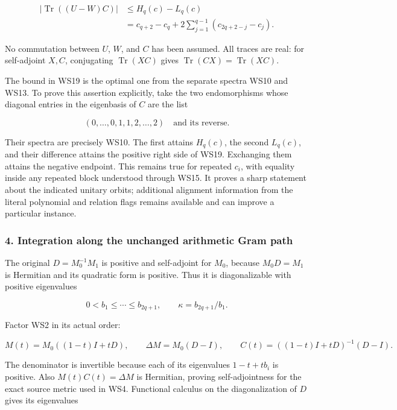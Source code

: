 \[
\boxed{
\begin{aligned}
\left|\operatorname{Tr}((U-W)C)\right|
&\le H_q(c)-L_q(c)\\
&=c_{q+2}-c_q
 +2\sum_{j=1}^{q-1}(c_{2q+2-j}-c_j).
\end{aligned}}
\tag{WS19}
\]

No commutation between \(U\), \(W\), and \(C\) has been assumed. All traces are real: for self-adjoint \(X,C\), conjugating \(\operatorname{Tr}(XC)\) gives \(\operatorname{Tr}(CX)=\operatorname{Tr}(XC)\).

The bound in WS19 is the optimal one from the separate spectra WS10 and WS13. To prove this assertion explicitly, take the two endomorphisms whose diagonal entries in the eigenbasis of \(C\) are the list

\[
(0,\ldots,0,1,1,2,\ldots,2)
\quad\text{and its reverse}.
\tag{WS20}
\]

Their spectra are precisely WS10. The first attains \(H_q(c)\), the second \(L_q(c)\), and their difference attains the positive right side of WS19. Exchanging them attains the negative endpoint. This remains true for repeated \(c_i\), with equality inside any repeated block understood through WS15. It proves a sharp statement about the indicated unitary orbits; additional alignment information from the literal polynomial and relation flags remains available and can improve a particular instance.

\subsubsection{4. Integration along the unchanged arithmetic Gram path}\label{endpoint-window_review--integration-along-the-unchanged-arithmetic-gram-path}

The original \(D=M_0^{-1}M_1\) is positive and self-adjoint for \(M_0\), because \(M_0D=M_1\) is Hermitian and its quadratic form is positive. Thus it is diagonalizable with positive eigenvalues

\[
0<b_1\le\cdots\le b_{2q+1},
\qquad\kappa=b_{2q+1}/b_1.
\tag{WS21}
\]

Factor WS2 in its actual order:

\[
M(t)=M_0((1-t)I+tD),
\qquad\Delta M=M_0(D-I),
\qquad
C(t)=((1-t)I+tD)^{-1}(D-I).
\tag{WS22}
\]

The denominator is invertible because each of its eigenvalues \(1-t+tb_i\) is positive. Also \(M(t)C(t)=\Delta M\) is Hermitian, proving self-adjointness for the exact source metric used in WS4. Functional calculus on the diagonalization of \(D\) gives its eigenvalues

